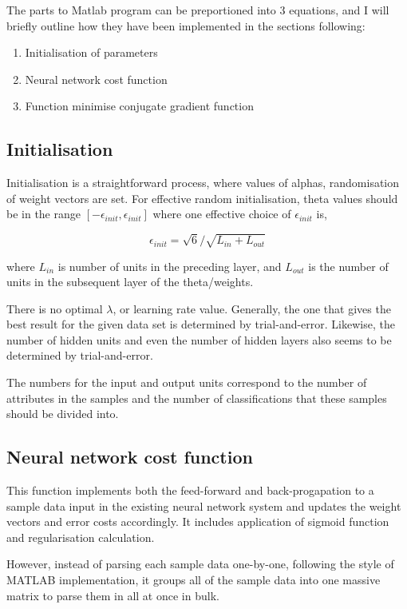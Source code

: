 The parts to Matlab program can be preportioned into 3 equations, and I will briefly outline how they have been implemented in the sections following:

\begin{enumerate}
  \item Initialisation of parameters
  \item Neural network cost function
  \item Function minimise conjugate gradient function
\end{enumerate}

\subsection{Initialisation} \label{se:impl.init}

Initialisation is a straightforward process, where values of alphas, randomisation of weight vectors are set. For effective random initialisation, theta values should be in the range $[-\epsilon_{init}, \epsilon_{init}]$ where one effective choice of $\epsilon_{init}$ is,

$$\epsilon_{init} = \sqrt{6} / \sqrt{L_{in} + L_{out}} $$

where $L_{in}$ is number of units in the preceding layer, and $L_{out}$ is the number of units in the subsequent layer of the theta/weights. 

There is no optimal $\lambda$, or learning rate value. Generally, the one that gives the best result for the given data set is determined by trial-and-error. Likewise, the number of hidden units and even the number of hidden layers also seems to be determined by trial-and-error.

The numbers for the input and output units correspond to the number of attributes in the samples and the number of classifications that these samples should be divided into.

\subsection{Neural network cost function} \label{se:impl.nnCostFunction}

This function implements both the feed-forward and back-progapation to a sample data input in the existing neural network system and updates the weight vectors and error costs accordingly. It includes application of sigmoid function and regularisation calculation. 

However, instead of parsing each sample data one-by-one, following the style of MATLAB implementation, it groups all of the sample data into one massive matrix to parse them in all at once in bulk. 

